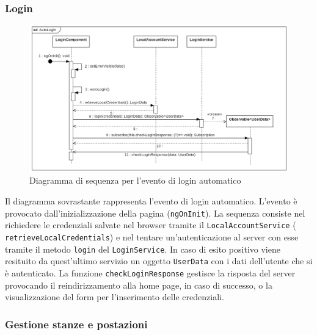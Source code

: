 \subsubsection{Login}
\begin{figure}[H]
	\centering
	\includegraphics[width=18cm]{res/images/webapp-autologin-diagrammaSequenza.png}
	\caption{Diagramma di sequenza per l'evento di login automatico}
	\label{fig:DiagrammaSequenzaAutoLogin}
\end{figure}
Il diagramma sovrastante rappresenta l'evento di login automatico. L'evento è provocato dall'inizializzazione della pagina (\texttt{ngOnInit}). La sequenza consiste nel richiedere le credenziali salvate nel browser tramite il \texttt{LocalAccountService} ( \texttt{retrieveLocalCredentials}) e nel tentare un'autenticazione al server con esse tramite il metodo \texttt{login} del \texttt{LoginService}. In caso di esito positivo viene resituito da quest'ultimo servizio un oggetto \texttt{UserData} con i dati dell'utente che si è autenticato. La funzione \texttt{checkLoginResponse} gestisce la risposta del server provocando il reindirizzamento alla home page, in caso di successo, o la visualizzazione del form per l'inserimento delle credenziali.
\subsubsection{Gestione stanze e postazioni}

